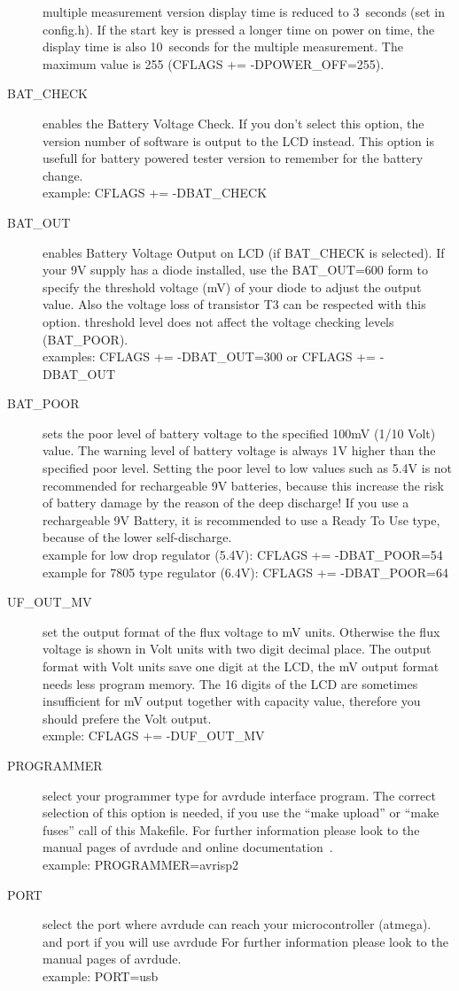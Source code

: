 \begin{description}
multiple measurement version display time is reduced to 3~seconds (set in config.h).
If the start key is pressed a longer time on power on time, the display time is also 10~seconds for the multiple measurement.
The maximum value is 255 (CFLAGS += -DPOWER\_OFF=255).
  \item[BAT\_CHECK] enables the Battery Voltage Check. If you don't select this option, the version number of
software is output to the LCD instead.
This option is usefull for battery powered tester version to remember for the battery change.\\
example: CFLAGS += -DBAT\_CHECK
  \item[BAT\_OUT] enables Battery Voltage Output on LCD (if BAT\_CHECK is selected).
 If your 9V supply has a diode installed, use the BAT\_OUT=600 form to specify the threshold voltage (mV) of your diode
to adjust the output value.
Also the voltage loss of transistor T3 can be respected with this option.
 threshold level does not affect the voltage checking levels (BAT\_POOR).\\
examples: CFLAGS += -DBAT\_OUT=300  or CFLAGS += -DBAT\_OUT
  \item[BAT\_POOR] sets the poor level of battery voltage to the specified 100mV (1/10 Volt) value.
The warning level of battery voltage is always 1V higher than the specified poor level.
Setting the poor level to low values such as 5.4V is not recommended for rechargeable 9V batteries,
because this increase the risk of battery damage by the reason of the deep discharge!
If you use a rechargeable 9V Battery, it is recommended to use a Ready To Use type, because of the lower self-discharge.\\
example for low drop regulator (5.4V): CFLAGS += -DBAT\_POOR=54
example for 7805 type regulator (6.4V): CFLAGS += -DBAT\_POOR=64
  \item[UF\_OUT\_MV] set the output format of the flux voltage to mV units.
Otherwise the flux voltage is shown in Volt units with two digit decimal place.
The output format with Volt units save one digit at the LCD, the mV output format needs less program memory.
The 16 digits of the LCD are sometimes insufficient for mV output together with capacity value, therefore you should prefere the Volt output.\\
exmple: CFLAGS += -DUF\_OUT\_MV
  \item[PROGRAMMER] select your programmer type for avrdude interface program.
The correct selection of this option is needed, if you use the ``make upload'' or ``make fuses'' call
of this Makefile.
For further information please look to the manual pages of avrdude and online documentation~\cite{avrdude}.\\
example: PROGRAMMER=avrisp2
  \item[PORT] select the port where avrdude can reach your microcontroller (atmega).
and port if you will use avrdude
For further information please look to the manual pages of avrdude.\\
example: PORT=usb

\end{description}

